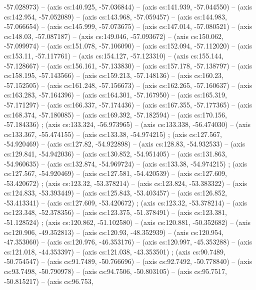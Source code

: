   -57.028973) -- (axis cs:140.925, -57.036844) -- (axis cs:141.939,
  -57.044550) -- (axis cs:142.954, -57.052089) -- (axis cs:143.968,
  -57.059457) -- (axis cs:144.983, -57.066654) -- (axis cs:145.999,
  -57.073675) -- (axis cs:147.014, -57.080521) -- (axis cs:148.03, -57.087187)
  -- (axis cs:149.046, -57.093672) -- (axis cs:150.062, -57.099974) -- (axis
  cs:151.078, -57.106090) -- (axis cs:152.094, -57.112020) -- (axis cs:153.11,
  -57.117761) -- (axis cs:154.127, -57.123310) -- (axis cs:155.144,
  -57.128667) -- (axis cs:156.161, -57.133830) -- (axis cs:157.178,
  -57.138797) -- (axis cs:158.195, -57.143566) -- (axis cs:159.213,
  -57.148136) -- (axis cs:160.23, -57.152505) -- (axis cs:161.248, -57.156673)
  -- (axis cs:162.265, -57.160637) -- (axis cs:163.283, -57.164396) -- (axis
  cs:164.301, -57.167950) -- (axis cs:165.319, -57.171297) -- (axis
  cs:166.337, -57.174436) -- (axis cs:167.355, -57.177365) -- (axis
  cs:168.374, -57.180085) -- (axis cs:169.392, -57.182594) -- (axis
  cs:170.156, -57.184336) ;  (axis cs:133.324,
  -56.973965) -- (axis cs:133.338, -56.474030) -- (axis cs:133.367,
  -55.474155) -- (axis cs:133.38, -54.974215) ; 
  (axis cs:127.567, -54.920469) -- (axis cs:127.82, -54.922898) -- (axis
  cs:128.83, -54.932533) -- (axis cs:129.841, -54.942036) -- (axis cs:130.852,
  -54.951405) -- (axis cs:131.863, -54.960635) -- (axis cs:132.874,
  -54.969724) -- (axis cs:133.38, -54.974215) ; 
  (axis cs:127.567, -54.920469) -- (axis cs:127.581, -54.420539) -- (axis
  cs:127.609, -53.420672) ;  (axis cs:123.32,
  -53.378214) -- (axis cs:123.824, -53.383322) -- (axis cs:124.833,
  -53.393449) -- (axis cs:125.843, -53.403457) -- (axis cs:126.852,
  -53.413341) -- (axis cs:127.609, -53.420672) ; 
  (axis cs:123.32, -53.378214) -- (axis cs:123.348, -52.378356) -- (axis
  cs:123.375, -51.378491) -- (axis cs:123.381, -51.128524)
  ;  (axis cs:120.862, -51.102580) -- (axis
  cs:120.881, -50.352682) -- (axis cs:120.906, -49.352813) -- (axis cs:120.93,
  -48.352939) -- (axis cs:120.954, -47.353060) -- (axis cs:120.976,
  -46.353176) -- (axis cs:120.997, -45.353288) -- (axis cs:121.018,
  -44.353397) -- (axis cs:121.038, -43.353501) ; 
  (axis cs:90.7489, -50.754547) -- (axis cs:91.7489, -50.766696) -- (axis
  cs:92.7492, -50.778840) -- (axis cs:93.7498, -50.790978) -- (axis
  cs:94.7506, -50.803105) -- (axis cs:95.7517, -50.815217) -- (axis cs:96.753,
